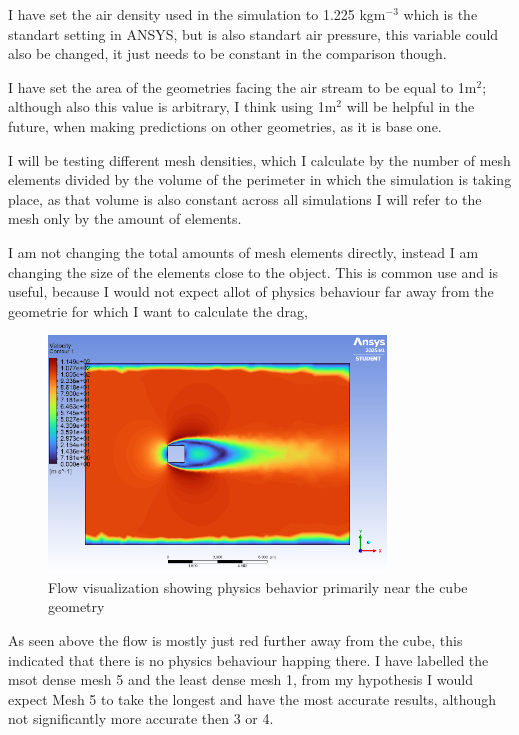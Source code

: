 \documentclass[12pt,a4paper]{article}
\begin{document}
I have set the air density used in the simulation to 1.225 kgm$^{-3}$ which is the standart setting in ANSYS, but is also standart air pressure, this variable could also be changed, it just needs to be constant in the comparison though.

 I have set the area of the geometries facing the air stream to be equal to 1m$^2$; although also this value is arbitrary, I think using 1m$^2$ will be helpful in the future, when making predictions on other geometries, as it is base one.

I will be testing different mesh densities, which I calculate by the number of mesh elements divided by the volume of the perimeter in which the simulation is taking place, as that volume is also constant across all simulations I will refer to the mesh only by the amount of elements.

I am not changing the total amounts of mesh elements directly, instead I am changing the size of the elements close to the object. This is common use and is useful, because I would not expect allot of physics behaviour far away from the geometrie for which I want to calculate the drag, 

\begin{figure}[H]
    \centering
    \includegraphics[width=0.8\textwidth]{image1.png}
    \caption{Flow visualization showing physics behavior primarily near the cube geometry}
    \label{fig:flow_viz}
\end{figure}

As seen above the flow is mostly just red further away from the cube, this indicated that there is no physics behaviour happing there. I have labelled the msot dense mesh 5 and the least dense mesh 1, from my hypothesis I would expect Mesh 5 to take the longest and have the most accurate results, although not significantly more accurate then 3 or 4. 
\end{document}
